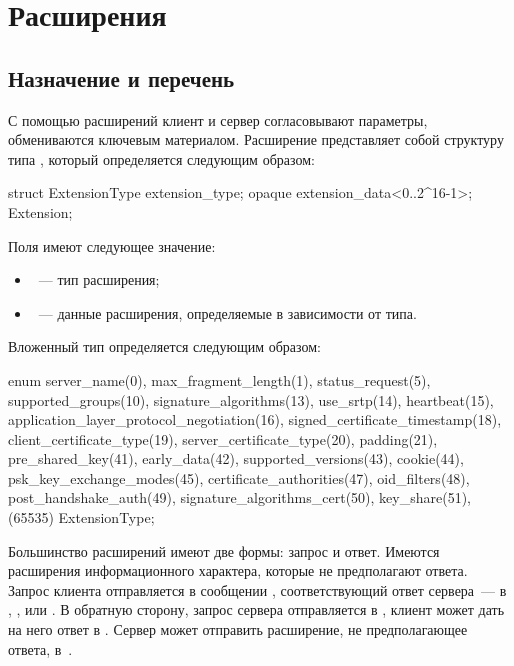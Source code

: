 \section{Расширения}\label{HS.Ext} 

\subsection{Назначение и перечень}\label{HS.Ext.List} 

С помощью расширений клиент и сервер согласовывают параметры, обмениваются 
ключевым материалом.
%
Расширение представляет собой структуру типа , который 
определяется следующим образом:
%
\begin{codeblock}
struct {
  ExtensionType extension_type;
  opaque extension_data<0..2^16-1>;
} Extension;
\end{codeblock}

Поля  имеют следующее значение:
\begin{itemize}
\item
{}~--- тип расширения;
\item
{}~--- данные расширения, определяемые в зависимости от типа.
\end{itemize}

Вложенный тип  определяется следующим образом:
\begin{codeblock}
enum {
  server_name(0),
  max_fragment_length(1),
  status_request(5),
  supported_groups(10),
  signature_algorithms(13),
  use_srtp(14),
  heartbeat(15),
  application_layer_protocol_negotiation(16),
  signed_certificate_timestamp(18),
  client_certificate_type(19),
  server_certificate_type(20),
  padding(21),
  pre_shared_key(41),
  early_data(42),
  supported_versions(43),
  cookie(44),
  psk_key_exchange_modes(45),
  certificate_authorities(47),
  oid_filters(48),
  post_handshake_auth(49),
  signature_algorithms_cert(50),
  key_share(51),
  (65535)
} ExtensionType;
\end{codeblock}

Большинство расширений имеют две формы: запрос и ответ.
%
Имеются расширения информационного характера, которые не предполагают ответа.
%
Запрос клиента отправляется в сообщении , 
соответствующий ответ сервера~--- в , 
,  или 
.
%
В обратную сторону, запрос сервера отправляется в 
, клиент может дать на него ответ в 
.
%
Сервер может отправить расширение, не предполагающее ответа, 
в~.

